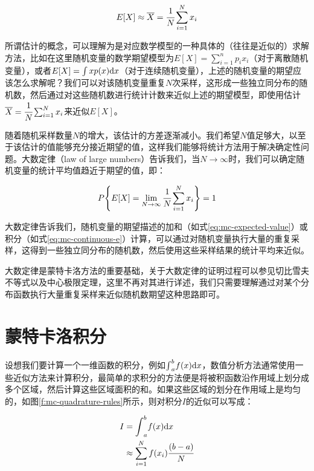 \begin{equation}
	E[X]\approx\overline{X}=  \cfrac{1}{N}\sum_{i=1}^{N}x_i
\end{equation}

\begin{myshaded}
	所谓估计的概念，可以理解为是对应数学模型的一种具体的（往往是近似的）求解方法，比如在这里随机变量的数学期望模型为$E[X]=\sum^{n}_{i=1}p_ix_i$（对于离散随机变量），或者$E[X]=\int xp(x){\rm d}x$（对于连续随机变量），上述的随机变量的期望应该怎么求解呢？我们可以对该随机变量重复$N$次采样，这形成一些独立同分布的随机数，然后通过对这些随机数进行统计计数来近似上述的期望模型，即使用估计$\overline{X}=  \cfrac{1}{N}\sum_{i=1}^{N}x_i$来近似$E[X]$。
\end{myshaded}

随着随机采样数量$N$的增大，该估计的方差逐渐减小。我们希望$N$值足够大，以至于该估计的值能够充分接近期望的值，这样我们能够将统计方法用于解决确定性问题。大数定律（law of large numbers）告诉我们，当$N\rightarrow\infty$时，我们可以确定随机变量的统计平均值趋近于期望的值，即：

\begin{equation}\label{eq:mc-large-numbers}
	P\Bigg\{ E[X]=\lim_{N \to \infty} \cfrac{1}{N}\sum_{i=1}^{N}x_i \Bigg\}=1
\end{equation} 

大数定律告诉我们，随机变量的期望描述的加和（如式\ref{eq:mc-expected-value}）或积分（如式\ref{eq:mc-continuous-e}）计算，可以通过对随机变量执行大量的重复采样，这得到一些独立同分布的随机数，然后使用这些采样结果的统计平均来近似。

大数定律是蒙特卡洛方法的重要基础，关于大数定律的证明过程可以参见切比雪夫不等式以及中心极限定理，这里不再对其进行详述，我们只需要理解通过对某个分布函数执行大量重复采样来近似随机数期望这种思路即可。




\section{蒙特卡洛积分}
设想我们要计算一个一维函数的积分，例如${\rm \int}_a^{b}f(x){\rm d}x$，数值分析方法通常使用一些近似方法来计算积分，最简单的求积分的方法便是将被积函数沿作用域上划分成多个区域，然后计算这些区域面积的和。如果这些区域的划分在作用域上是均匀的，如图\ref{f:mc-quadrature-rules}所示，则对积分$I$的近似可以写成：

\begin{equation}\label{eq:mc-quadrature-rules}
	\begin{aligned}
		I&={\rm \int}_{a}^{b}f(x){\rm d}x \\
		&\approx \sum_{i=1}^{N}f(x_i) \cfrac{(b-a)}{N}
	\end{aligned}
\end{equation}

